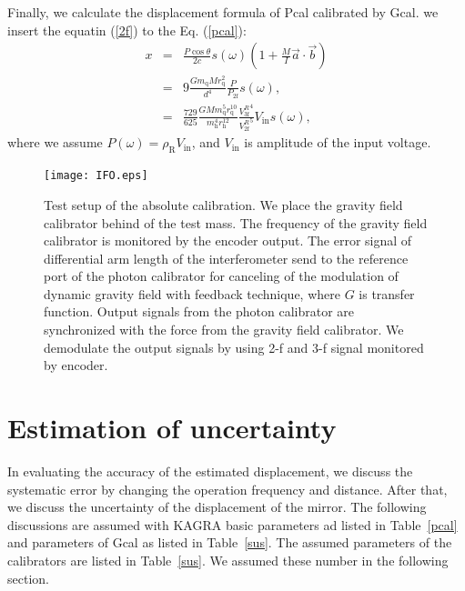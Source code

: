 \documentclass[A4]{spie}  %
\begin{document}
Finally, we calculate the displacement formula of Pcal calibrated by Gcal. we insert the equatin (\ref{2f}) to the Eq. (\ref{pcal}):
\begin{eqnarray}
x&=&\frac{P \cos{\theta}}{2c} s(\omega)\left(1+\frac{M}{I}\vec{a} \cdot \vec{b} \right) \\
 &=&9\frac{Gm_{\mathrm{q}} M r_{\mathrm{q}}^2}{d^4}\frac{P}{P_{\mathrm{2f}}}s(\omega) , \\
 &=&\frac{729}{625} \frac{GM m^5_{\mathrm{q}} r_{\mathrm{q}}^{10}}{m^4_{\mathrm{h}} r_{\mathrm{h}}^{12} } \frac{{V_{\mathrm{3f}}^{R}}^4}{{V_{\mathrm{2f}}^{R}}^5}V_{\mathrm{in}} s(\omega)  , \label{pcal_new}
\end{eqnarray}
where we assume $P(\omega)=\rho_{\mathrm{R}} V_{\mathrm{in}}$, and $V_{\mathrm{in}}$ is amplitude of the input voltage.
\begin{figure}
\begin{center}
\texttt{[image: IFO.eps]}
\caption{Test setup of the absolute calibration. We place the gravity field calibrator behind of the test mass. The frequency of the gravity field calibrator is monitored by the encoder output. The error signal of differential arm length of the interferometer send to the reference port of the photon calibrator for canceling of the modulation of dynamic gravity field with feedback technique, where $G$ is transfer function. Output signals from the photon calibrator are synchronized with the force from the gravity field calibrator. We demodulate the output signals by using 2-f and 3-f signal monitored by encoder.}
\label{fig:IFO}
\end{center}
\end{figure}

\section{Estimation of uncertainty} \label{sec:EST}
In evaluating the accuracy of the estimated displacement, we discuss the systematic error by changing the operation frequency and distance. After that, we discuss the uncertainty of the displacement of the mirror. 
The following discussions are assumed with KAGRA basic parameters ad listed in Table~\ref{pcal} and parameters of Gcal as listed in Table~\ref{sus}. The assumed parameters of the calibrators are listed in Table~\ref{sus}. We assumed these number in the following section.
\end{document}
